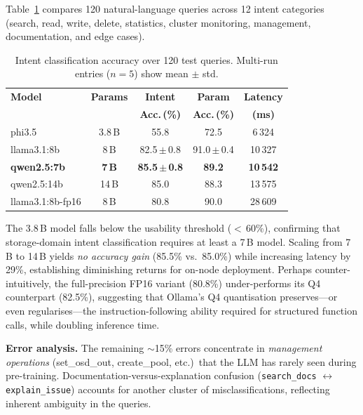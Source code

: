 \documentclass[sigplan,nonacm,10pt]{acmart}
\begin{document}
Table~\ref{tab:intent} compares 120 natural-language queries across
12 intent categories (search, read, write, delete, statistics,
cluster monitoring, management, documentation, and edge cases).

\begin{table}[t]
\centering\small
\caption{Intent classification accuracy over 120 test queries.
Multi-run entries ($n{=}5$) show mean $\pm$ std.}
\label{tab:intent}
\begin{tabular}{@{}lcccc@{}}
\toprule
\textbf{Model} & \textbf{Params} & \textbf{Intent} & \textbf{Param} & \textbf{Latency} \\
& & \textbf{Acc.\,(\%)} & \textbf{Acc.\,(\%)} & \textbf{(ms)} \\
\midrule
phi3.5           & 3.8\,B & 55.8          & 72.5          & 6\,324 \\
llama3.1:8b      & 8\,B   & 82.5\,$\pm$\,0.8 & 91.0\,$\pm$\,0.4 & 10\,327 \\
\textbf{qwen2.5:7b} & \textbf{7\,B} & \textbf{85.5\,$\pm$\,0.8} & \textbf{89.2}  & \textbf{10\,542} \\
qwen2.5:14b      & 14\,B  & 85.0          & 88.3          & 13\,575 \\
llama3.1:8b-fp16 & 8\,B   & 80.8          & 90.0          & 28\,609 \\
\bottomrule
\end{tabular}
\end{table}

The 3.8\,B model falls below the usability threshold ($<$\,60\%),
confirming that storage-domain intent classification requires at
least a 7\,B model.
Scaling from 7\,B to 14\,B yields \emph{no accuracy gain}
(85.5\% vs.\ 85.0\%) while increasing latency by 29\%,
establishing diminishing returns for on-node deployment.
Perhaps counter-intuitively, the full-precision FP16 variant
(80.8\%) under-performs its Q4 counterpart (82.5\%), suggesting
that Ollama's Q4 quantisation preserves---or even regularises---the
instruction-following ability required for structured function calls,
while doubling inference time.

\smallskip\noindent
\textbf{Error analysis.}\enspace
The remaining ${\sim}$15\% errors concentrate in \emph{management
operations} (set\_osd\_out, create\_pool, etc.)\ that the LLM has
rarely seen during pre-training.
Documentation-versus-explanation confusion
(\texttt{search\_docs} $\leftrightarrow$ \texttt{explain\_issue})
accounts for another cluster of misclassifications, reflecting
inherent ambiguity in the queries.
\end{document}
